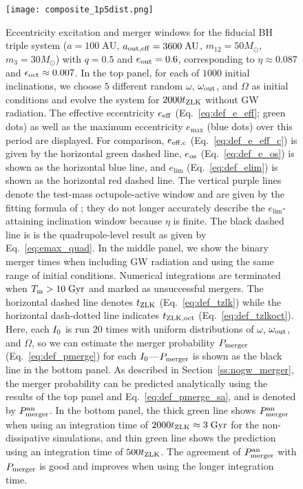 \documentclass[
        fleqn,
        usenatbib,
    ]{mnras}
\newlength{\colummwidth}
\begin{document}
\begin{figure}
    \centering
    \texttt{[image: composite\_1p5dist.png]}
    \caption{Eccentricity excitation and merger windows for the fiducial BH
    triple system ($a = 100\;\mathrm{AU}$, $a_{\rm out, eff} =
    3600\;\mathrm{AU}$, $m_{12} = 50M_{\odot}$, $m_3 = 30M_{\odot}$) with $q =
    0.5$ and $e_{\rm out} = 0.6$, corresponding to $\eta \approx 0.087$ and
    $\epsilon_{\rm oct} \approx 0.007$. In the top panel, for each of $1000$
    initial inclinations, we choose $5$ different random $\omega$, $\omega_{\rm
    out}$, and $\Omega$ as initial conditions and evolve the system for
    $2000t_{\rm ZLK}$ without GW radiation. The effective eccentricity $e_{\rm
    eff}$ (Eq.~\ref{eq:def_e_eff}; green dots) as well as the maximum
    eccentricity $e_{\max}$ (blue dots) over this period are displayed. For
    comparison, $e_{\rm eff, c}$ (Eq.~\ref{eq:def_e_eff_c}) is given by the
    horizontal green dashed line, $e_{\rm os}$ (Eq.~\ref{eq:def_e_os}) is shown
    as the horizontal blue line, and $e_{\lim}$ (Eq.~\ref{eq:def_elim}) is shown
    as the horizontal red dashed line. The vertical purple lines denote the
    test-mass octupole-active window and are given by the fitting formula of
    \citet{MLL16}; they do not longer accurately describe the
    $e_{\lim}$-attaining inclination window because $\eta$ is finite. The black
    dashed line is is the quadrupole-level result as given by
    Eq.~\eqref{eq:emax_quad}. In the middle panel, we show the binary merger
    times when including GW radiation and using the same range of initial
    conditions. Numerical integrations are terminated when $T_{\rm m} >
    10\;\mathrm{Gyr}$ and marked as unsuccessful mergers. The horizontal dashed
    line denotes $t_{\rm ZLK}$ (Eq.~\ref{eq:def_tzlk}) while the horizontal
    dash-dotted line indicates $t_{\rm ZLK, oct}$ (Eq.~\ref{eq:def_tzlkoct}).
    Here, each $I_{\rm 0}$ is run $20$ times with uniform distributions of
    $\omega$, $\omega_{\rm out}$, and $\Omega$, so we can estimate the merger
    probability $P_{\rm merger}$ (Eq.~\ref{eq:def_pmerge}) for each $I_{\rm
    0}$---$P_{\rm merger}$ is shown as the black line in the bottom panel. As
    described in Section~\ref{ss:nogw_merger}, the merger probability can be
    predicted analytically using the results of the top panel and
    Eq.~\eqref{eq:def_pmerge_sa}, and is denoted by $P_{\rm merger}^{\rm an}$.
    In the bottom panel, the thick green line shows $P_{\rm merger}^{\rm an}$
    when using an integration time of $2000 t_{\rm ZLK} \approx 3\;\mathrm{Gyr}$
    for the non-dissipative simulations, and thin green line shows the
    prediction using an integration time of $500 t_{\rm ZLK}$. The agreement of
    $P_{\rm merger}^{\rm an}$ with $P_{\rm merger}$ is good and improves when
    using the longer integration time.
    }\label{fig:composite_dist}
\end{figure}
\end{document}
